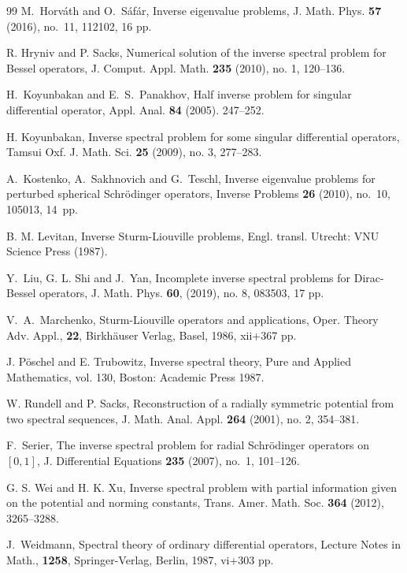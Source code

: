 \documentclass[reqno,12pt,centertags]{amsart}
\numberwithin{equation}{section}
\theoremstyle{definition}
\begin{document}
\begin{thebibliography}{99}
M.~Horv\'{a}th and O.~S\'{a}f\'{a}r,
Inverse eigenvalue problems,
J. Math. Phys. \textbf{57} (2016), no.~11, 112102, 16 pp.

R. Hryniv and P. Sacks, 
Numerical solution of the inverse spectral problem for Bessel operators,
J. Comput. Appl. Math. \textbf{235} (2010), no. 1, 120--136.

H.~Koyunbakan and E.~S.~Panakhov, 
Half inverse problem for singular differential operator, 
Appl. Anal. \textbf{84} (2005). 247--252.

H. Koyunbakan, 
Inverse spectral problem for some singular differential operators,
Tamsui Oxf. J. Math. Sci. \textbf{25} (2009), no. 3, 277--283.

A.~Kostenko, A.~Sakhnovich and G.~Teschl,
Inverse eigenvalue problems for perturbed spherical Schr\"odinger operators,
Inverse Problems \textbf{26} (2010), no.~10, 105013, 14~pp.

B. M. Levitan, 
Inverse Sturm-Liouville problems,
Engl. transl. Utrecht: VNU Science Press (1987).

Y.~Liu, G. L. Shi and J.~Yan, 
Incomplete inverse spectral problems for Dirac-Bessel operators, 
J. Math. Phys. \textbf{60}, (2019),  no. 8, 083503, 17 pp.

V.~A.~Marchenko, 
Sturm-Liouville operators and applications,
Oper. Theory Adv. Appl., \textbf{22}, Birkh\"auser Verlag, Basel, 1986, xii+367 pp.

J. P\"{o}schel and E. Trubowitz, 
Inverse spectral theory,
Pure and Applied Mathematics, vol. 130, Boston: Academic Press 1987.

W. Rundell and P. Sacks,
Reconstruction of a radially symmetric potential from two spectral sequences,
J. Math. Anal. Appl. \textbf{264} (2001), no. 2, 354--381.

F.~Serier, 
The inverse spectral problem for radial Schr\"{o}dinger operators on $[0,1]$,
J. Differential Equations \textbf{235} (2007), no.~1, 101--126.

G. S. Wei and H. K. Xu, 
Inverse spectral problem with partial information given on the potential and norming constants, 
Trans. Amer. Math. Soc. \textbf{364} (2012), 3265--3288. 

J.~Weidmann, 
Spectral theory of ordinary differential operators,
Lecture Notes in Math., \textbf{1258}, Springer-Verlag, Berlin, 1987, vi+303 pp.


\end{thebibliography}
\end{document}
